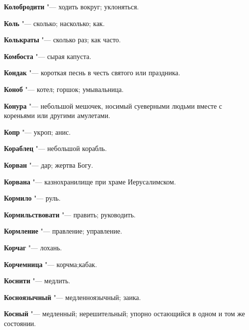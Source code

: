 \begin{mymulticols}{2}
\noindent\textbf{Колобродити} "--- ходить вокруг; уклоняться. 




\noindent\textbf{Коль} "--- сколько; насколько; как. 




\noindent\textbf{Колькраты} "--- сколько раз; как часто. 




\noindent\textbf{Комбоста} "--- сырая капуста. 




\noindent\textbf{Кондак} "--- короткая песнь в честь святого или праздника. 




\noindent\textbf{Коноб} "--- котел; горшок; умывальница. 




\noindent\textbf{Конура} "--- небольшой мешочек, носимый суеверными людьми вместе с кореньями или другими амулетами. 




\noindent\textbf{Копр} "--- укроп; анис. 




\noindent\textbf{Кораблец} "--- небольшой корабль. 




\noindent\textbf{Корван} "--- дар; жертва Богу. 




\noindent\textbf{Корвана} "--- казнохранилище при храме Иерусалимском. 




\noindent\textbf{Кормило} "--- руль. 




\noindent\textbf{Кормильствовати} "--- править; руководить. 




\noindent\textbf{Кормление} "--- правление; управление. 




\noindent\textbf{Корчаг} "--- лохань. 




\noindent\textbf{Корчемница} "--- корчма;кабак. 




\noindent\textbf{Коснити} "--- медлить. 




\noindent\textbf{Косноязычный} "--- медленноязычный; заика. 




\noindent\textbf{Косный} "--- медленный; нерешительный; упорно остающийся в одном и том же состоянии. 





\end{mymulticols}
